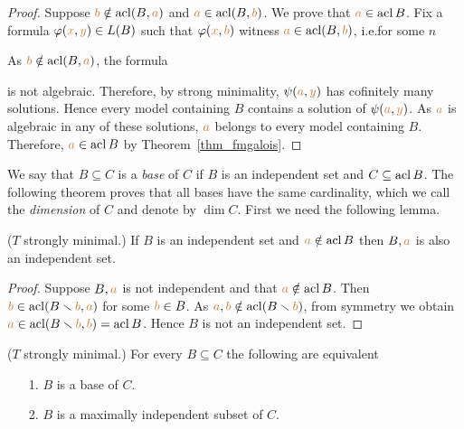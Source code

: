 \begin{proof} 
Suppose ${\color{brown} b}\notin\mathop{\rm acl}(B,{\color{brown} a})$ and ${\color{brown} a}\in\mathop{\rm acl}(B,{\color{brown} b})$. We prove that ${\color{brown} a}\in\mathop{\rm acl} B$. Fix a formula $\varphi({\color{brown} x},{\color{brown} y})\in L(B)$ such that $\varphi({\color{brown} x},{\color{brown} b})$ witness ${\color{brown} a}\in\mathop{\rm acl}(B,{\color{brown} b})$, i.e.\@ for some $n$


As ${\color{brown} b}\notin\mathop{\rm acl}(B,{\color{brown} a})$, the formula


is not algebraic. Therefore, by strong minimality, $\psi({\color{brown} a},{\color{brown} y})$ has cofinitely many solutions. Hence every model containing $B$ contains a solution of $\psi({\color{brown} a},{\color{brown} y})$. As ${\color{brown} a}$ is algebraic in any of these solutions, ${\color{brown} a}$ belongs to every model containing $B$. Therefore, ${\color{brown} a}\in\mathop{\rm acl} B$ by Theorem~\ref{thm_fmgalois}.
\end{proof}

% 

We say that $B\subseteq C$ is a \emph{base\/} of $C$ if $B$ is an independent set and $C\subseteq\mathop{\rm acl} B$. The following theorem proves that all bases have the same cardinality, which we call the  \emph{dimension\/} of $C$ and denote by \emph{$\dim C$}. First we need the following lemma.

\begin{lemma}\label{indipendenza+1}
($T$ strongly minimal.) If $B$ is an independent set and ${\color{brown} a}\notin \mathop{\rm acl} B$ then $B,{\color{brown} a}$ is also an independent set.
\end{lemma}
\begin{proof}
Suppose $B,{\color{brown} a}$ is not independent and that ${\color{brown} a}\notin \mathop{\rm acl} B$. Then ${\color{brown} b}\in\mathop{\rm acl}(B\smallsetminus {\color{brown}b},{\color{brown} a})$ for some ${\color{brown} b}\in B$. As ${\color{brown} a},{\color{brown} b}\notin\mathop{\rm acl}(B\smallsetminus {\color{brown}b})$, from symmetry we obtain ${\color{brown} a}\in\mathop{\rm acl}(B\smallsetminus {\color{brown}b},{\color{brown} b})=\mathop{\rm acl} B$. Hence $B$ is not an independent set. 
\end{proof}

\begin{corollary}\label{basemassimale}
($T$ strongly minimal.) For every $B\subseteq C$ the following are equivalent
\begin{itemize}
\item[1.] $B$ is a base of $C$.
\item[2.] $B$ is a maximally independent subset of $C$.\QED
\end{itemize}
\end{corollary}

